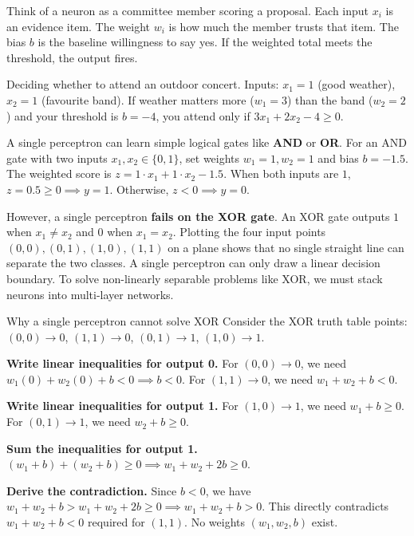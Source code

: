 \documentclass[a4paper,11pt]{article}
\begin{document}
\begin{intuition}
Think of a neuron as a committee member scoring a proposal. Each input $x_i$ is an evidence item. The weight $w_i$ is how much the member trusts that item. The bias $b$ is the baseline willingness to say yes. If the weighted total meets the threshold, the output fires.
\end{intuition}

\begin{everyday}
Deciding whether to attend an outdoor concert. Inputs: $x_1 = 1$ (good weather), $x_2 = 1$ (favourite band). If weather matters more ($w_1 = 3$) than the band ($w_2 = 2$) and your threshold is $b = -4$, you attend only if $3x_1 + 2x_2 - 4 \ge 0$.
\end{everyday}

A single perceptron can learn simple logical gates like \textbf{AND} or \textbf{OR}. For an AND gate with two inputs $x_1, x_2 \in \{0, 1\}$, set weights $w_1 = 1, w_2 = 1$ and bias $b = -1.5$. The weighted score is $z = 1\cdot x_1 + 1\cdot x_2 - 1.5$. When both inputs are $1$, $z = 0.5 \ge 0 \implies y = 1$. Otherwise, $z < 0 \implies y = 0$.

However, a single perceptron \textbf{fails on the XOR gate}. An XOR gate outputs $1$ when $x_1 \neq x_2$ and $0$ when $x_1 = x_2$.
Plotting the four input points $(0,0), (0,1), (1,0), (1,1)$ on a plane shows that no single straight line can separate the two classes. A single perceptron can only draw a linear decision boundary. To solve non-linearly separable problems like XOR, we must stack neurons into multi-layer networks.

\begin{worked}{Why a single perceptron cannot solve XOR}
Consider the XOR truth table points: $(0,0) \to 0$, $(1,1) \to 0$, $(0,1) \to 1$, $(1,0) \to 1$.
\begin{steps}
  \item \textbf{Write linear inequalities for output 0.}
        For $(0,0) \to 0$, we need $w_1(0) + w_2(0) + b < 0 \implies b < 0$.
        For $(1,1) \to 0$, we need $w_1 + w_2 + b < 0$.
  \item \textbf{Write linear inequalities for output 1.}
        For $(1,0) \to 1$, we need $w_1 + b \ge 0$.
        For $(0,1) \to 1$, we need $w_2 + b \ge 0$.
  \item \textbf{Sum the inequalities for output 1.}
        $(w_1 + b) + (w_2 + b) \ge 0 \implies w_1 + w_2 + 2b \ge 0$.
  \item \textbf{Derive the contradiction.}
        Since $b < 0$, we have $w_1 + w_2 + b > w_1 + w_2 + 2b \ge 0 \implies w_1 + w_2 + b > 0$.
        This directly contradicts $w_1 + w_2 + b < 0$ required for $(1,1)$.
        No weights $(w_1, w_2, b)$ exist.
\end{steps}
\end{worked}
\end{document}
